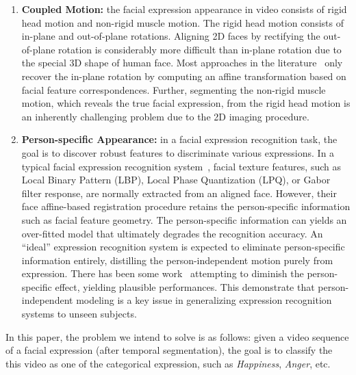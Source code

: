 \documentclass[journal]{IEEEtran}
\begin{document}
\begin{enumerate}

\item \textbf{Coupled Motion:} the facial expression appearance in video consists of rigid head motion and non-rigid muscle motion. The rigid head motion consists of in-plane and out-of-plane rotations. Aligning 2D faces by rectifying the out-of-plane rotation is considerably more difficult than in-plane rotation due to the special 3D shape of human face. Most approaches in the literature~\cite{Bartlett_FG11}\cite{Valstar_FERA11} only recover the in-plane rotation by computing an affine transformation based on facial feature correspondences. Further, segmenting the non-rigid muscle motion, which reveals the true facial expression, from the rigid head motion is an inherently challenging problem due to the 2D imaging procedure.

\item \textbf{Person-specific Appearance:} in a facial expression recognition task, the goal is to discover robust features to discriminate various expressions. In a typical facial expression recognition system~\cite{Bartlett_FG11}\cite{Valstar_SMCB12}, facial texture features, such as Local Binary Pattern (LBP), Local Phase Quantization (LPQ), or Gabor filter response, are normally extracted from an aligned face. However, their face affine-based registration procedure retains the person-specific information such as facial feature geometry. The person-specific information can yields an over-fitted model that ultimately degrades the recognition accuracy. An ``ideal'' expression recognition system is expected to eliminate person-specific information entirely, distilling the person-independent motion purely from expression. There has been some work~\cite{Yang_SMCB12}\cite{Dahmane_TMM14} attempting to diminish the person-specific effect, yielding plausible performances. This demonstrate that person-independent modeling is a key issue in generalizing expression recognition systems to unseen subjects.

\end{enumerate}

In this paper, the problem we intend to solve is as follows: given a video sequence of a facial expression (after temporal segmentation), the goal is to classify the this video as one of the categorical expression, such as \textit{Happiness}, \textit{Anger}, etc. 
\end{document}
